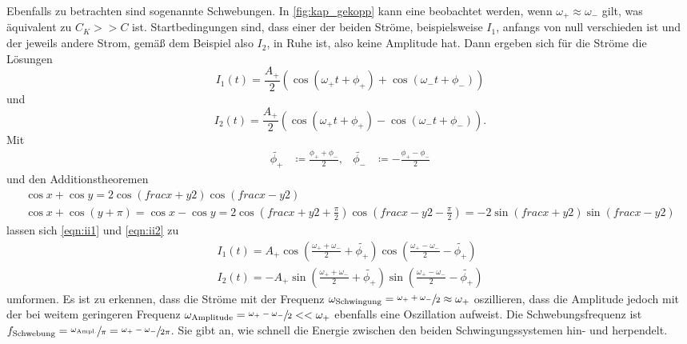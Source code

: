 Ebenfalls zu betrachten sind sogenannte Schwebungen. 
In \ref{fig:kap_gekopp} kann eine beobachtet werden, wenn ${\omega _+ \approx \omega _-}$ gilt, was äquivalent zu 
${C_K >> C}$ ist. 
Startbedingungen sind, dass einer der beiden Ströme, beispielsweise $I_1$, anfangs von null verschieden ist und der 
jeweils andere Strom, gemäß dem Beispiel also $I_2$, in Ruhe ist, also keine Amplitude hat. 
Dann ergeben sich für die Ströme die Lösungen 
\begin{equation}
    I_1 (t) = \frac{A_+}{2} ( \cos(\omega _+ t + \phi _+) + \cos(\omega _- t + \phi _-))
    \label{eqn:ii1}
\end{equation}
und 
\begin{equation}
    I_2 (t) = \frac{A_+}{2} ( \cos(\omega _+ t + \phi _+) - \cos(\omega _- t + \phi _-)) .
    \label{eqn:ii2}
\end{equation}
Mit 
\begin{align}
    \tilde{\phi _+} &\coloneq \frac{\phi _+ + \phi _-}{2} ,
    & \tilde{\phi _-} &\coloneq - \frac{\phi _+ - \phi _-}{2}
\end{align}
und den Additionstheoremen 
\begin{gather}
    \cos x + \cos y = 2 \cos(frac{x+y}{2}) \cos(frac{x-y}{2}) \\
    \cos x + \cos(y + \pi) = \cos x - \cos y = 2 \cos(frac{x+y}{2} + \frac{\pi}{2}) \cos(frac{x-y}{2} - \frac{\pi}{2})
        =-2  \sin(frac{x+y}{2}) \sin(frac{x-y}{2})
\end{gather}
lassen sich \ref{eqn:ii1} und \ref{eqn:ii2} zu 
\begin{gather}
    I_1 (t)= A_+ \cos(\frac{\omega _+ + \omega _-}{2} +\tilde{\phi _+}) \cos(\frac{\omega _+ - \omega _-}{2} -\tilde{\phi _+}) \\
    I_2 (t)=-A_+ \sin(\frac{\omega _+ + \omega _-}{2} +\tilde{\phi _+}) \sin(\frac{\omega _+ - \omega _-}{2} -\tilde{\phi _+})
\end{gather}
umformen.
Es ist zu erkennen, dass die Ströme mit der Frequenz ${\omega _\text{Schwingung} = \sfrac{\omega _+ + \omega _-}{2} \approx \omega _+}$ 
oszillieren, dass die Amplitude jedoch mit der bei weitem geringeren Frequenz ${\omega _\text{Amplitude} = \sfrac{\omega _+ - \omega _-}{2} << \omega _+}$ 
ebenfalls eine Oszillation aufweist. 
Die Schwebungsfrequenz ist ${f_\text{Schwebung}= \sfrac{\omega _\text{Ampl.}}{\pi}=\sfrac{\omega _+ - \omega _-}{2 \pi}}$. 
Sie gibt an, wie schnell die Energie zwischen den beiden Schwingungssystemen hin- und herpendelt. 

